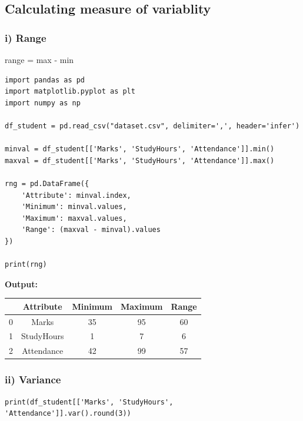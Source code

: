 
\subsection{Calculating measure of variablity}

\subsubsection*{i) Range}

range = max - min

\begin{lstlisting}[style=python]
import pandas as pd 
import matplotlib.pyplot as plt 
import numpy as np

df_student = pd.read_csv("dataset.csv", delimiter=',', header='infer')

minval = df_student[['Marks', 'StudyHours', 'Attendance']].min()
maxval = df_student[['Marks', 'StudyHours', 'Attendance']].max()

rng = pd.DataFrame({
    'Attribute': minval.index,
    'Minimum': minval.values,
    'Maximum': maxval.values,
    'Range': (maxval - minval).values
})

print(rng)
\end{lstlisting}

\textbf{Output:}

\begin{tabular}{ccccc}
    \toprule
    & \textbf{Attribute} & \textbf{Minimum} & \textbf{Maximum} & \textbf{Range} \\
    \midrule
    0 & Marks  & 35 & 95 & 60 \\
    1 & StudyHours  & 1 & 7 & 6 \\
    2 & Attendance  & 42 & 99 & 57 \\
    \bottomrule
\end{tabular}


\subsubsection*{ii) Variance}

\begin{lstlisting}[style=python]
print(df_student[['Marks', 'StudyHours', 'Attendance']].var().round(3))
\end{lstlisting}

